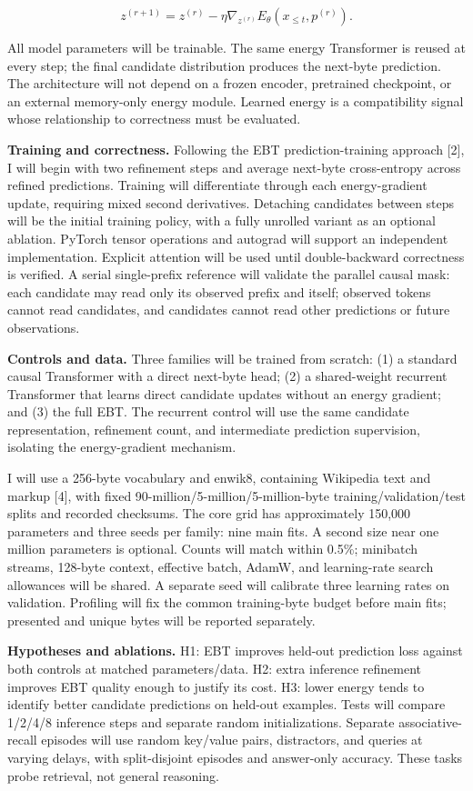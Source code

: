 \documentclass[11pt,letterpaper]{article}
\begin{document}
\[
z^{(r+1)}=z^{(r)}-\eta\nabla_{z^{(r)}}E_\theta(x_{\leq t},p^{(r)}).
\]

All model parameters will be trainable. The same energy Transformer is reused at every step; the final candidate distribution produces the next-byte prediction. The architecture will not depend on a frozen encoder, pretrained checkpoint, or an external memory-only energy module. Learned energy is a compatibility signal whose relationship to correctness must be evaluated.

\textbf{Training and correctness.} Following the EBT prediction-training approach [2], I will begin with two refinement steps and average next-byte cross-entropy across refined predictions. Training will differentiate through each energy-gradient update, requiring mixed second derivatives. Detaching candidates between steps will be the initial training policy, with a fully unrolled variant as an optional ablation. PyTorch tensor operations and autograd will support an independent implementation. Explicit attention will be used until double-backward correctness is verified. A serial single-prefix reference will validate the parallel causal mask: each candidate may read only its observed prefix and itself; observed tokens cannot read candidates, and candidates cannot read other predictions or future observations.

\textbf{Controls and data.} Three families will be trained from scratch: (1) a standard causal Transformer with a direct next-byte head; (2) a shared-weight recurrent Transformer that learns direct candidate updates without an energy gradient; and (3) the full EBT. The recurrent control will use the same candidate representation, refinement count, and intermediate prediction supervision, isolating the energy-gradient mechanism.

I will use a 256-byte vocabulary and enwik8, containing Wikipedia text and markup [4], with fixed 90-million/5-million/5-million-byte training/validation/test splits and recorded checksums. The core grid has approximately 150,000 parameters and three seeds per family: nine main fits. A second size near one million parameters is optional. Counts will match within 0.5\%; minibatch streams, 128-byte context, effective batch, AdamW, and learning-rate search allowances will be shared. A separate seed will calibrate three learning rates on validation. Profiling will fix the common training-byte budget before main fits; presented and unique bytes will be reported separately.

\textbf{Hypotheses and ablations.} H1: EBT improves held-out prediction loss against both controls at matched parameters/data. H2: extra inference refinement improves EBT quality enough to justify its cost. H3: lower energy tends to identify better candidate predictions on held-out examples. Tests will compare 1/2/4/8 inference steps and separate random initializations. Separate associative-recall episodes will use random key/value pairs, distractors, and queries at varying delays, with split-disjoint episodes and answer-only accuracy. These tasks probe retrieval, not general reasoning.
\end{document}
